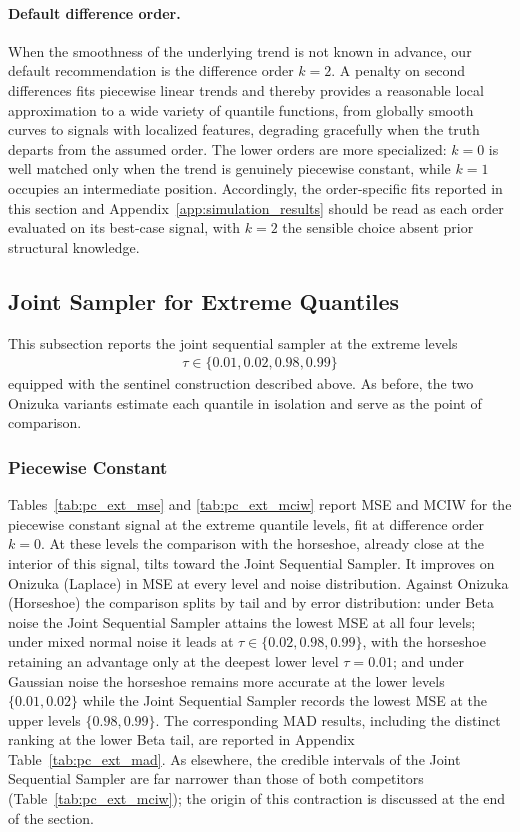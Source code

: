 \paragraph{Default difference order.} When the smoothness of the underlying trend is not known in advance, our default recommendation is the difference order $k = 2$. A penalty on second differences fits piecewise linear trends and thereby provides a reasonable local approximation to a wide variety of quantile functions, from globally smooth curves to signals with localized features, degrading gracefully when the truth departs from the assumed order. The lower orders are more specialized: $k = 0$ is well matched only when the trend is genuinely piecewise constant, while $k = 1$ occupies an intermediate position. Accordingly, the order-specific fits reported in this section and Appendix~\ref{app:simulation_results} should be read as each order evaluated on its best-case signal, with $k = 2$ the sensible choice absent prior structural knowledge.

\subsection{Joint Sampler for Extreme Quantiles}
\label{sec:sim:joint}

This subsection reports the joint sequential sampler at the extreme levels
\begin{align*}
	\tau \in \{0.01, 0.02, 0.98, 0.99\}
\end{align*} 
equipped with the sentinel construction described above. As before, the two Onizuka variants estimate each quantile in isolation and serve as the point of comparison.

\subsubsection{Piecewise Constant}
\label{sec:sim:joint:pc}

Tables~\ref{tab:pc_ext_mse} and \ref{tab:pc_ext_mciw} report MSE and MCIW for the piecewise constant signal at the extreme quantile levels, fit at difference order $k = 0$. At these levels the comparison with the horseshoe, already close at the interior of this signal, tilts toward the Joint Sequential Sampler. It improves on Onizuka (Laplace) in MSE at every level and noise distribution. Against Onizuka (Horseshoe) the comparison splits by tail and by error distribution: under Beta noise the Joint Sequential Sampler attains the lowest MSE at all four levels; under mixed normal noise it leads at $\tau \in \{0.02, 0.98, 0.99\}$, with the horseshoe retaining an advantage only at the deepest lower level $\tau = 0.01$; and under Gaussian noise the horseshoe remains more accurate at the lower levels $\{0.01, 0.02\}$ while the Joint Sequential Sampler records the lowest MSE at the upper levels $\{0.98, 0.99\}$. The corresponding MAD results, including the distinct ranking at the lower Beta tail, are reported in Appendix Table~\ref{tab:pc_ext_mad}. As elsewhere, the credible intervals of the Joint Sequential Sampler are far narrower than those of both competitors (Table~\ref{tab:pc_ext_mciw}); the origin of this contraction is discussed at the end of the section.

